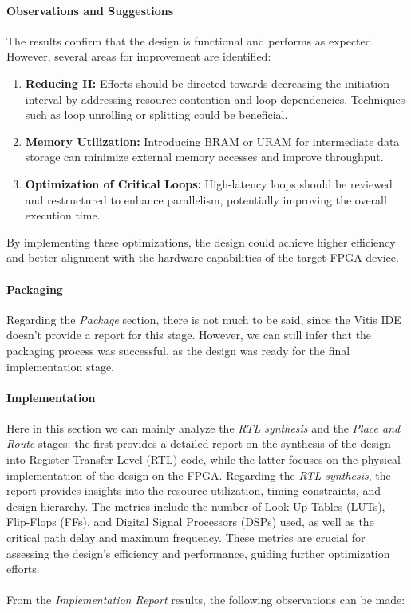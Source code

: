 \documentclass{article}
\begin{document}
\paragraph{Observations and Suggestions}
The results confirm that the design is functional and performs as expected. However, several areas for improvement are identified:
\begin{enumerate}
    \item \textbf{Reducing II:} Efforts should be directed towards decreasing the initiation interval by addressing resource contention and loop dependencies. Techniques such as loop unrolling or splitting could be beneficial.
    \item \textbf{Memory Utilization:} Introducing BRAM or URAM for intermediate data storage can minimize external memory accesses and improve throughput.
    \item \textbf{Optimization of Critical Loops:} High-latency loops should be reviewed and restructured to enhance parallelism, potentially improving the overall execution time.
\end{enumerate}

By implementing these optimizations, the design could achieve higher efficiency and better alignment with the hardware capabilities of the target FPGA device.

\paragraph{Packaging}
Regarding the \textit{Package} section, there is  not much to be said, since the Vitis IDE doesn't provide a report for this stage. However, we can still infer that the packaging process was successful, as the design was ready for the final implementation stage.

\paragraph{Implementation}

Here in this section we can mainly analyze the \textit{RTL synthesis} and the \textit{Place and Route} stages: the first provides a detailed report on the synthesis of the design into Register-Transfer Level (RTL) code, while the latter focuses on the physical implementation of the design on the FPGA.
Regarding the \textit{RTL synthesis}, the report provides insights into the resource utilization, timing constraints, and design hierarchy. The metrics include the number of Look-Up Tables (LUTs), Flip-Flops (FFs), and Digital Signal Processors (DSPs) used, as well as the critical path delay and maximum frequency. These metrics are crucial for assessing the design's efficiency and performance, guiding further optimization efforts.
\\\\ From the \textit{Implementation Report} results, the following observations can be made:
\end{document}
